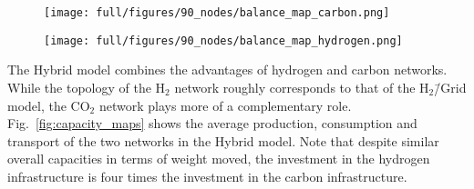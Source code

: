 \documentclass[twocolumn]{article}
\newcommand{\COtwo}{CO$_2$}
\newcommand{\Htwo}{H$_2$}
\newcommand{\modH}{H$_2$\=/Grid model}
\newcommand{\modHybrid}{Hybrid model}
\newcommand{\carbon}{CO$_2$}
\newcommand{\hydrogen}{H$_2$}
\newcommand{\hybridmodel}{Hybrid model}
\begin{document}
\begin{figure*}[ht!]
    \centering
    \begin{subfigure}{.5\textwidth}
        \centering
        \texttt{[image: full/figures/90\_nodes/balance\_map\_carbon.png]}
        \label{fig:capacity_map_carbon_co2}
    \end{subfigure}%
    \begin{subfigure}{.5\textwidth}
        \centering
        \texttt{[image: full/figures/90\_nodes/balance\_map\_hydrogen.png]}
        \label{fig:capacity_map_hydrogen_co2}
    \end{subfigure}
    \caption{Optimal operation, flows and prices of the carbon (left) and hydrogen (right) sectors for the \hybridmodel{} in the net zero scenario. For each region, upper semicircles show the average production per technology, lower semicircles the consumption, and colors the average marginal prices. Carbon Sequestration offshore are drawn as full circles. Lines and arrows show the interregional transportation. \carbon{} from point-source in the inland either supplies local CU with imported \hydrogen{} or facilitates sequestration in nearby offshore regions.
    }
    \label{fig:capacity_maps}
\end{figure*}

The \modHybrid{} combines the advantages of hydrogen and carbon networks. While the topology of the \Htwo{} network roughly corresponds to that of the \modH{}, the \COtwo{} network plays more of a complementary role. Fig.~\ref{fig:capacity_maps} shows the average production, consumption and transport of the two networks in the \modHybrid{}. Note that despite similar overall capacities in terms of weight moved, the investment in the hydrogen infrastructure is four times the investment in the carbon infrastructure.
\end{document}
